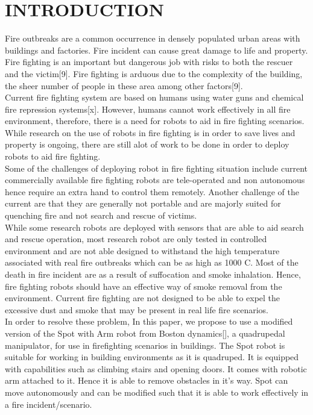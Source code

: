 \section{INTRODUCTION}\label{Sec:intro}
Fire outbreaks are a common occurrence in densely populated urban areas with buildings and factories. Fire incident can cause great damage to life and property. Fire fighting is an important but dangerous job with risks to both the rescuer and the victim[9]. Fire fighting is arduous due to the complexity of the building, the sheer number of people in these area among other factors[9].\\

Current fire fighting system are based on humans using water guns and chemical fire repression systems[x]. However, humans cannot work effectively in all fire environment, therefore, there is a need for robots to aid in fire fighting scenarios. While research on the use of robots in fire fighting is in order to save lives and property is ongoing, there are still alot of work to be done in order to deploy robots to aid fire fighting.\\

Some of the challenges of deploying robot in fire fighting situation include current commercially available fire fighting robots are tele-operated and non autonomous hence require an extra hand to control them remotely. Another challenge of the current are that they are generally not portable and are majorly suited for quenching fire and not search and rescue of victims.\\

While some research robots are deployed with sensors that are able to aid search and rescue operation, most research robot are only tested in controlled environment and are not able designed to withstand the high temperature associated with real fire outbreaks which can be as high as 1000  \degree C. Most of the death in fire incident are as a result of suffocation and smoke inhalation. Hence, fire fighting robots should have an effective way of smoke removal from the environment. Current fire fighting are not designed to be able to expel the excessive dust and smoke that may be present in real life fire scenarios. \\

In order to resolve these problem, In this paper, we propose to use a modified version of the Spot with Arm robot from Boston dynamics[], a quadrupedal manipulator, for use in firefighting scenarios in buildings.  The Spot robot is suitable for working in building environments as it is quadruped. It is equipped with capabilities such as climbing stairs and opening doors. It comes with robotic arm attached to it. Hence it is able to remove obstacles in it's way. Spot can move autonomously and can be modified such that it is able to work effectively in a fire incident/scenario.\\

